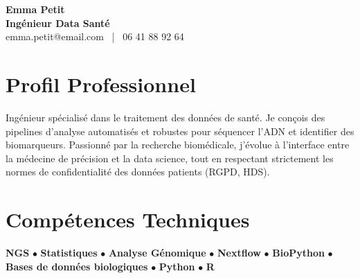 \documentclass[11pt,a4paper]{article}
\begin{document}
\begin{center}
    {\Huge \textbf{Emma Petit}} \\[0.2cm]
    {\Large \textbf{Ingénieur Data Santé}} \\[0.1cm]
    emma.petit@email.com \ | \ 06 41 88 92 64
\end{center}

\vspace{0.3cm}

\section*{Profil Professionnel}
\noindent
Ingénieur spécialisé dans le traitement des données de santé. Je conçois des pipelines d'analyse automatisés et robustes pour séquencer l'ADN et identifier des biomarqueurs. Passionné par la recherche biomédicale, j'évolue à l'interface entre la médecine de précision et la data science, tout en respectant strictement les normes de confidentialité des données patients (RGPD, HDS).

\vspace{0.3cm}

\section*{Compétences Techniques}
\noindent
\textbf{NGS} $\bullet$ \textbf{Statistiques} $\bullet$ \textbf{Analyse Génomique} $\bullet$ \textbf{Nextflow} $\bullet$ \textbf{BioPython} $\bullet$ \textbf{Bases de données biologiques} $\bullet$ \textbf{Python} $\bullet$ \textbf{R}

\vspace{0.3cm}

\end{document}
